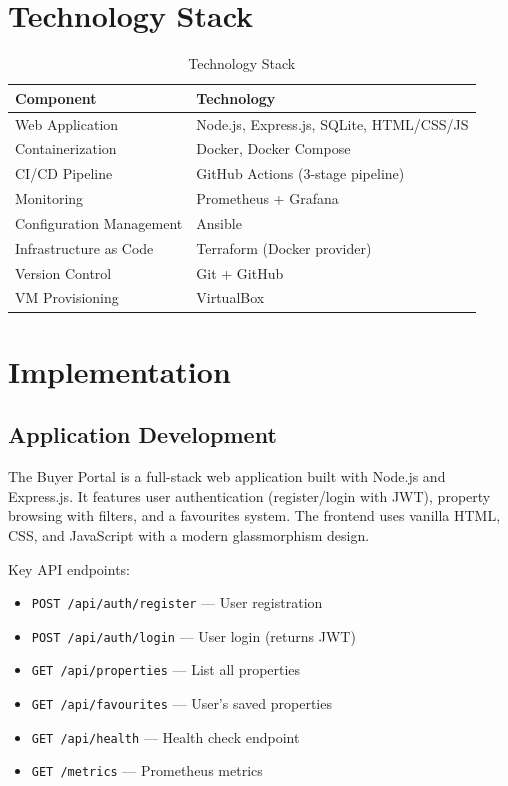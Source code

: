 \documentclass[12pt,a4paper]{article}
\begin{document}
\section{Technology Stack}

\begin{table}[h!]
\centering
\begin{tabular}{@{}ll@{}}
\toprule
\textbf{Component} & \textbf{Technology} \\
\midrule
Web Application & Node.js, Express.js, SQLite, HTML/CSS/JS \\
Containerization & Docker, Docker Compose \\
CI/CD Pipeline & GitHub Actions (3-stage pipeline) \\
Monitoring & Prometheus + Grafana \\
Configuration Management & Ansible \\
Infrastructure as Code & Terraform (Docker provider) \\
Version Control & Git + GitHub \\
VM Provisioning & VirtualBox \\
\bottomrule
\end{tabular}
\caption{Technology Stack}
\end{table}

\section{Implementation}

\subsection{Application Development}
The Buyer Portal is a full-stack web application built with Node.js and Express.js. It features user authentication (register/login with JWT), property browsing with filters, and a favourites system. The frontend uses vanilla HTML, CSS, and JavaScript with a modern glassmorphism design.

Key API endpoints:
\begin{itemize}[nosep]
    \item \texttt{POST /api/auth/register} --- User registration
    \item \texttt{POST /api/auth/login} --- User login (returns JWT)
    \item \texttt{GET /api/properties} --- List all properties
    \item \texttt{GET /api/favourites} --- User's saved properties
    \item \texttt{GET /api/health} --- Health check endpoint
    \item \texttt{GET /metrics} --- Prometheus metrics
\end{itemize}
\end{document}
